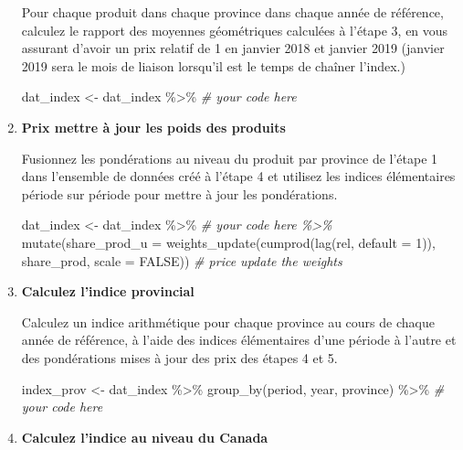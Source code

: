 \documentclass[
]{article}
\newenvironment{Shaded}{\begin{snugshade}}{\end{snugshade}}
\newcommand{\AttributeTok}[1]{\textcolor[rgb]{0.77,0.63,0.00}{#1}}
\newcommand{\CommentTok}[1]{\textcolor[rgb]{0.56,0.35,0.01}{\textit{#1}}}
\newcommand{\ConstantTok}[1]{\textcolor[rgb]{0.00,0.00,0.00}{#1}}
\newcommand{\DecValTok}[1]{\textcolor[rgb]{0.00,0.00,0.81}{#1}}
\newcommand{\FunctionTok}[1]{\textcolor[rgb]{0.00,0.00,0.00}{#1}}
\newcommand{\NormalTok}[1]{#1}
\newcommand{\OtherTok}[1]{\textcolor[rgb]{0.56,0.35,0.01}{#1}}
\newcommand{\SpecialCharTok}[1]{\textcolor[rgb]{0.00,0.00,0.00}{#1}}
\begin{document}
\begin{enumerate}
  Pour chaque produit dans chaque province dans chaque année de référence, calculez le rapport des moyennes géométriques calculées à l'étape 3, en vous assurant d'avoir un prix relatif de 1 en janvier 2018 et janvier 2019 (janvier 2019 sera le mois de liaison lorsqu'il est le temps de chaîner l'index.)

\begin{Shaded}
\begin{Highlighting}[]
\NormalTok{dat\_index }\OtherTok{\textless{}{-}}\NormalTok{ dat\_index }\SpecialCharTok{\%\textgreater{}\%}  
  \CommentTok{\# your code here}
\end{Highlighting}
\end{Shaded}
\item
  \textbf{Prix mettre à jour les poids des produits}

  Fusionnez les pondérations au niveau du produit par province de l'étape 1 dans l'ensemble de données créé à l'étape 4 et utilisez les indices élémentaires période sur période pour mettre à jour les pondérations.

\begin{Shaded}
\begin{Highlighting}[]
\NormalTok{dat\_index }\OtherTok{\textless{}{-}}\NormalTok{ dat\_index }\SpecialCharTok{\%\textgreater{}\%}  
  \CommentTok{\# your code here \%\textgreater{}\%}
  \FunctionTok{mutate}\NormalTok{(}\AttributeTok{share\_prod\_u =} \FunctionTok{weights\_update}\NormalTok{(}\FunctionTok{cumprod}\NormalTok{(}\FunctionTok{lag}\NormalTok{(rel, }\AttributeTok{default =} \DecValTok{1}\NormalTok{)), share\_prod, }\AttributeTok{scale =} \ConstantTok{FALSE}\NormalTok{)) }\CommentTok{\# price update the weights}
\end{Highlighting}
\end{Shaded}
\item
  \textbf{Calculez l'indice provincial}

  Calculez un indice arithmétique pour chaque province au cours de chaque année de référence, à l'aide des indices élémentaires d'une période à l'autre et des pondérations mises à jour des prix des étapes 4 et 5.

\begin{Shaded}
\begin{Highlighting}[]
\NormalTok{index\_prov }\OtherTok{\textless{}{-}}\NormalTok{ dat\_index }\SpecialCharTok{\%\textgreater{}\%}
  \FunctionTok{group\_by}\NormalTok{(period, year, province) }\SpecialCharTok{\%\textgreater{}\%}
  \CommentTok{\# your code here}
\end{Highlighting}
\end{Shaded}
\item
  \textbf{Calculez l'indice au niveau du Canada}


\end{enumerate}
\end{document}
